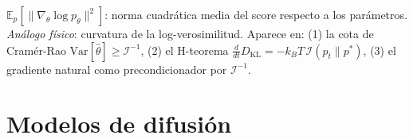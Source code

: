 \begin{description}[leftmargin=0pt, labelwidth=!, labelsep=1em,
  font=\normalfont\bfseries, style=nextline]
\item[Información de Fisher $\mathcal{I}(\theta)$]
$\mathbb{E}_p[\|\nabla_\theta\log p_\theta\|^2]$: norma cuadrática media
del score respecto a los parámetros.\\
\emph{Análogo físico}: curvatura de la log-verosimilitud. Aparece en:
(1) la cota de Cramér-Rao $\mathrm{Var}[\hat\theta]\geq\mathcal{I}^{-1}$,
(2) el H-teorema $\frac{d}{dt}D_{\mathrm{KL}} = -k_BT\,\mathcal{I}(p_t\|p^*)$,
(3) el gradiente natural como precondicionador por $\mathcal{I}^{-1}$.

\end{description}

\section*{Modelos de difusión}

